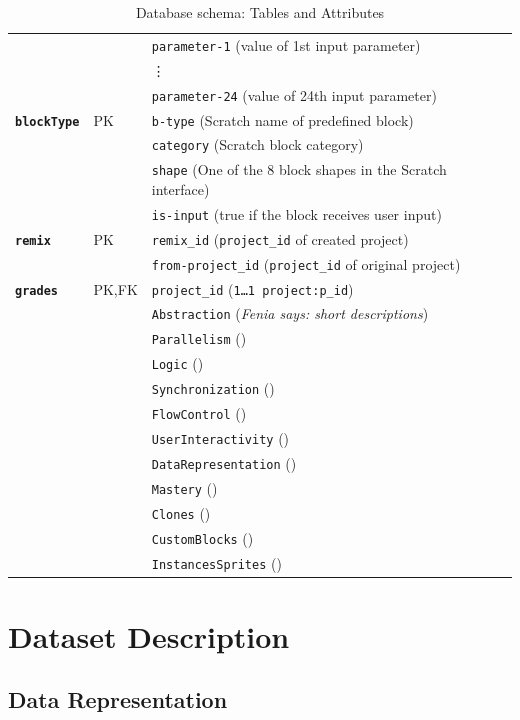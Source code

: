 \documentclass[10pt, conference]{IEEEtran}
\newcommand{\fenia}[1]{\emph{\color{blue}Fenia says: #1}}
\begin{document}
\begin{table}[]
\begin{tabular}{llp{5.4cm}}
		&  & \texttt{parameter-1} (value of 1st input parameter)\\
		&  &\vdots\\
		&  & \texttt{parameter-24} (value of 24th input parameter)\\
		\hline
		\textbf{\texttt{blockType}} & PK & \texttt{b-type} (Scratch name of predefined block)\\
		&  & \texttt{category} (Scratch block category)\\
		&  & \texttt{shape} (One of the 8 block shapes in the Scratch interface)\\
		&  & \texttt{is-input} (true if the block receives user input)\\
		\hline
		\textbf{\texttt{remix}} & PK  & \texttt{remix\_id} (\texttt{\scriptsize{project\_id}} of created project)\\
		&  & \texttt{from-project\_id} (\texttt{\scriptsize{project\_id}} of original project)\\
		\hline
		\textbf{\texttt{grades}} & PK,FK & \texttt{project\_id} (\texttt{\scriptsize{1\ldots1 project:p\_id}})\\
		& & \texttt{Abstraction} (\fenia{short descriptions})\\
		& & \texttt{Parallelism} ()\\
		& & \texttt{Logic} ()\\
		& & \texttt{Synchronization} ()\\
		& & \texttt{FlowControl} ()\\
		& & \texttt{UserInteractivity} ()\\
		& & \texttt{DataRepresentation} ()\\
		& & \texttt{Mastery} ()\\
		& & \texttt{Clones} ()\\
		& & \texttt{CustomBlocks} ()\\
		& & \texttt{InstancesSprites} ()\\
		\hline
	\end{tabular}
	\caption{Database schema: Tables and Attributes}
	\label{tbl-dbschema}
\end{table}

\section{Dataset Description}

\subsection{Data Representation}
\end{document}
